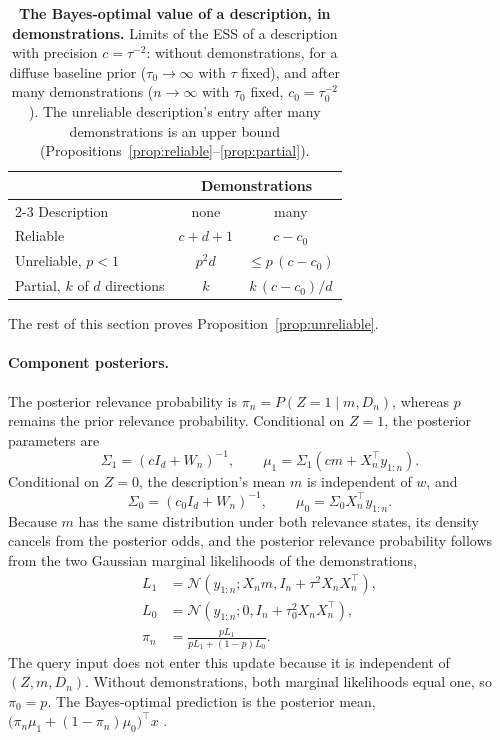 \begin{table}[t]
\centering\small
\caption[The Bayes-optimal value of a description, in demonstrations]{\textbf{The Bayes-optimal value of a description, in demonstrations.} Limits of the ESS of a description with precision $c=\tau^{-2}$: without demonstrations, for a diffuse baseline prior ($\tau_0\to\infty$ with $\tau$ fixed), and after many demonstrations ($n\to\infty$ with $\tau_0$ fixed, $c_0=\tau_0^{-2}$). The unreliable description's entry after many demonstrations is an upper bound (Propositions~\ref{prop:reliable}--\ref{prop:partial}).}
\label{tab:summary}
\vspace{3pt}
\begin{tabular}{lcc}
\toprule
& \multicolumn{2}{c}{Demonstrations} \\
\cmidrule(lr){2-3}
Description & none & many \\
\midrule
Reliable & $c+d+1$ & $c-c_0$ \\
Unreliable, $p<1$ & $p^2d$ & $\leq p\,(c-c_0)$ \\
Partial, $k$ of $d$ directions & $k$ & $k\,(c-c_0)/d$ \\
\bottomrule
\end{tabular}
\end{table}

The rest of this section proves Proposition~\ref{prop:unreliable}.

\paragraph{Component posteriors.}
The posterior relevance probability is $\pi_n=P(Z=1\mid m,D_n)$, whereas $p$ remains the prior relevance probability. Conditional on $Z=1$, the posterior parameters are
\[
\Sigma_1=(cI_d+W_n)^{-1},
\qquad
\mu_1=\Sigma_1(c m+X_n^\top y_{1:n}).
\]
Conditional on $Z=0$, the description's mean $m$ is independent of $w$, and
\[
\Sigma_0=(c_0I_d+W_n)^{-1},
\qquad
\mu_0=\Sigma_0X_n^\top y_{1:n}.
\]
Because $m$ has the same distribution under both relevance states, its density cancels from the posterior odds, and the posterior relevance probability follows from the two Gaussian marginal likelihoods of the demonstrations,
\begin{align*}
L_1&=\mathcal N\!\left(y_{1:n};X_nm,I_n+\tau^2X_nX_n^\top\right),\\
L_0&=\mathcal N\!\left(y_{1:n};0,I_n+\tau_0^2X_nX_n^\top\right),\\
\pi_n&=\frac{pL_1}{pL_1+(1-p)L_0}.
\end{align*}
The query input does not enter this update because it is independent of $(Z,m,D_n)$. Without demonstrations, both marginal likelihoods equal one, so $\pi_0=p$. The Bayes-optimal prediction is the posterior mean, $\big(\pi_n\mu_1+(1-\pi_n)\mu_0\big)^\top x$ \citep{hoeting1999}.

